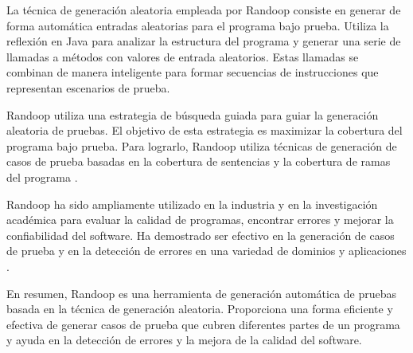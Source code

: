 La técnica de generación aleatoria empleada por Randoop consiste en generar de forma automática entradas aleatorias para el programa bajo prueba. Utiliza la reflexión en Java para analizar la estructura del programa y generar una serie de llamadas a métodos con valores de entrada aleatorios. Estas llamadas se combinan de manera inteligente para formar secuencias de instrucciones que representan escenarios de prueba.

Randoop utiliza una estrategia de búsqueda guiada para guiar la generación aleatoria de pruebas. El objetivo de esta estrategia es maximizar la cobertura del programa bajo prueba. Para lograrlo, Randoop utiliza técnicas de generación de casos de prueba basadas en la cobertura de sentencias y la cobertura de ramas del programa \cite{pacheco2007randoop}.



Randoop ha sido ampliamente utilizado en la industria y en la investigación académica para evaluar la calidad de programas, encontrar errores y mejorar la confiabilidad del software. Ha demostrado ser efectivo en la generación de casos de prueba y en la detección de errores en una variedad de dominios y aplicaciones \cite{pacheco2007randoop, pacheco2008feedback}.

En resumen, Randoop es una herramienta de generación automática de pruebas basada en la técnica de generación aleatoria. Proporciona una forma eficiente y efectiva de generar casos de prueba que cubren diferentes partes de un programa y ayuda en la detección de errores y la mejora de la calidad del software.

